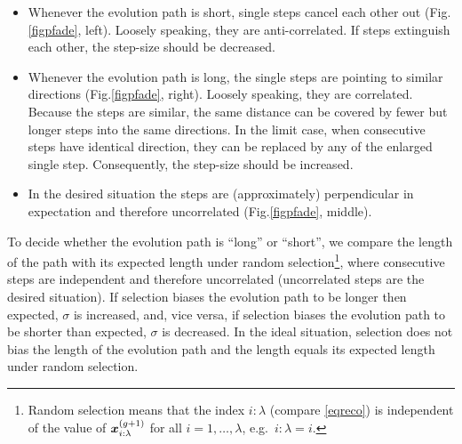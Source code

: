 \documentclass{article} %
\newcommand{\kom}[1]{}
\newcommand{\ve}[1]{\mathchoice{\mbox{\boldmath$\displaystyle#1$}}
  {\mbox{\boldmath$\textstyle#1$}} {\mbox{\boldmath$\scriptstyle#1$}}
  {\mbox{\boldmath$\scriptscriptstyle#1$}}}
\newcommand{\lam}{\ensuremath{\lambda}}
\newcommand{\sig}{\ensuremath{\sigma}}
\newcommand{\xgg}{\ve{x}^{(g+1)}}
\newcommand{\pref}[1]{\mbox{.\hspace{0.235em}\ref{#1}}}
\newcommand{\eqrefadd}[1]{(\ref{#1})} %
\begin{document}
%
\begin{itemize}
\item Whenever the evolution path is short, single steps cancel each other
  out (Fig\pref{figpfade}, left).  Loosely speaking, they are
  anti-correlated.  If steps extinguish each other, the step-size
  should be decreased.
\item Whenever the evolution path is long, the single steps are
  pointing to similar directions (Fig\pref{figpfade}, right).  Loosely
  speaking, they are correlated.  Because the steps are similar, the
  same distance can be covered by fewer but longer steps into the same
  directions. In the limit case, when consecutive steps have
  identical direction, they can be replaced by any of the enlarged single
  step.  Consequently, the step-size should be increased.
\item In the desired situation the steps are (approximately)
  perpendicular in expectation and therefore uncorrelated
  (Fig\pref{figpfade}, middle).
\end{itemize}
%
To decide whether the evolution path is ``long'' or ``short'', we
compare the length of the path with its
expected length under random selection\footnote{%
%
  Random selection means that the index \mbox{$i:\lam$} (compare
  \eqref{eqreco}\kom{ and \eqrefadd{eqcov}}) is independent of the value of
  $\xgg_{i:\lam}$ for all $i=1,\dots,\lam$, e.g.\ ${i:\lam}=i$. },
%
where consecutive steps are independent and therefore
uncorrelated (uncorrelated steps are the
desired situation). If selection biases the evolution path to be
longer then expected, $\sig$ is increased, and, vice versa, if
selection biases the evolution path to be shorter than expected,
$\sig$ is decreased. In the ideal situation, selection does not
bias the length of the evolution path and the length equals its
expected length under random selection.
\end{document}

